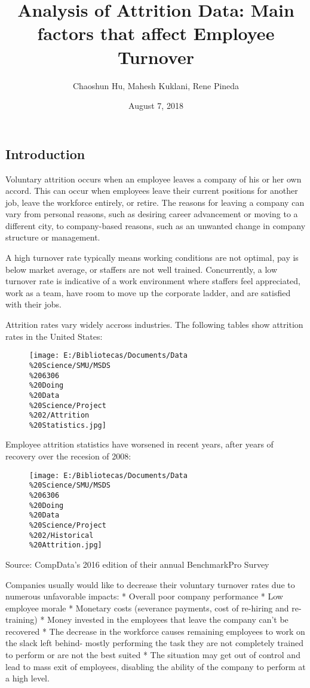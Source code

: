 \documentclass[]{article}
\title{Analysis of Attrition Data: Main factors that affect Employee Turnover}
\author{Chaoshun Hu, Mahesh Kuklani, Rene Pineda}
\date{August 7, 2018}
\begin{document}
\maketitle

\subsection{Introduction}\label{introduction}

Voluntary attrition occurs when an employee leaves a company of his or
her own accord. This can occur when employees leave their current
positions for another job, leave the workforce entirely, or retire. The
reasons for leaving a company can vary from personal reasons, such as
desiring career advancement or moving to a different city, to
company-based reasons, such as an unwanted change in company structure
or management.

A high turnover rate typically means working conditions are not optimal,
pay is below market average, or staffers are not well trained.
Concurrently, a low turnover rate is indicative of a work environment
where staffers feel appreciated, work as a team, have room to move up
the corporate ladder, and are satisfied with their jobs.

Attrition rates vary widely accross industries. The following tables
show attrition rates in the United States:

\begin{figure}[htbp]
\centering
\texttt{[image: E:/Bibliotecas/Documents/Data\\\%20Science/SMU/MSDS\\\%206306\\\%20Doing\\\%20Data\\\%20Science/Project\\\%202/Attrition\\\%20Statistics.jpg]}
\caption{}
\end{figure}

Employee attrition statistics have worsened in recent years, after years
of recovery over the recesion of 2008:

\begin{figure}[htbp]
\centering
\texttt{[image: E:/Bibliotecas/Documents/Data\\\%20Science/SMU/MSDS\\\%206306\\\%20Doing\\\%20Data\\\%20Science/Project\\\%202/Historical\\\%20Attrition.jpg]}
\caption{}
\end{figure}

Source: CompData's 2016 edition of their annual BenchmarkPro Survey

Companies usually would like to decrease their voluntary turnover rates
due to numerous unfavorable impacts: * Overall poor company performance
* Low employee morale * Monetary costs (severance payments, cost of
re-hiring and re-training) * Money invested in the employees that leave
the company can't be recovered * The decrease in the workforce causes
remaining employees to work on the slack left behind- mostly performing
the task they are not completely trained to perform or are not the best
suited * The situation may get out of control and lead to mass exit of
employees, disabling the ability of the company to perform at a high
level.
\end{document}
